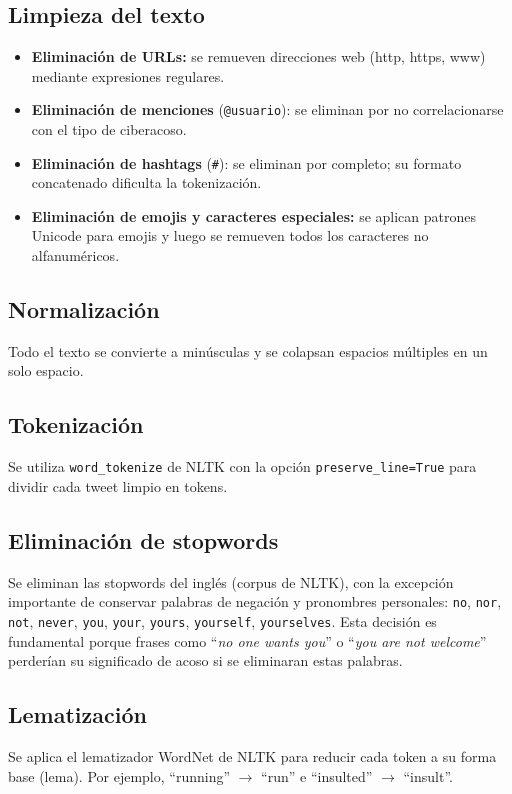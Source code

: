 ﻿\documentclass[12pt,a4paper]{article}
\begin{document}
\subsection{Limpieza del texto}
\begin{itemize}
  \item \textbf{Eliminación de URLs:} se remueven direcciones web
        (http, https, www) mediante expresiones regulares.
  \item \textbf{Eliminación de menciones} (\texttt{@usuario}):
        se eliminan por no correlacionarse con el tipo de ciberacoso.
  \item \textbf{Eliminación de hashtags} (\texttt{\#}):
        se eliminan por completo; su formato concatenado dificulta
        la tokenización.
  \item \textbf{Eliminación de emojis y caracteres especiales:}
        se aplican patrones Unicode para emojis y luego se remueven
        todos los caracteres no alfanuméricos.
\end{itemize}

\subsection{Normalización}
Todo el texto se convierte a minúsculas y se colapsan espacios múltiples
en un solo espacio.

\subsection{Tokenización}
Se utiliza \texttt{word\_tokenize} de NLTK con la opción
\texttt{preserve\_line=True} para dividir cada tweet limpio en tokens.

\subsection{Eliminación de stopwords}
Se eliminan las stopwords del inglés (corpus de NLTK), con la excepción
importante de conservar palabras de negación y pronombres personales:
\texttt{no}, \texttt{nor}, \texttt{not}, \texttt{never}, \texttt{you},
\texttt{your}, \texttt{yours}, \texttt{yourself}, \texttt{yourselves}.
Esta decisión es fundamental porque frases como ``\textit{no one wants you}''
o ``\textit{you are not welcome}'' perderían su significado de acoso si se
eliminaran estas palabras.

\subsection{Lematización}
Se aplica el lematizador WordNet de NLTK para reducir cada token a su forma
base (lema). Por ejemplo, ``running'' $\to$ ``run'' e
``insulted'' $\to$ ``insult''.
\end{document}

